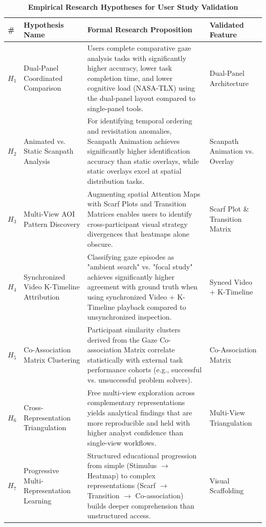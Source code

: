 \documentclass[11pt,a4paper]{article}
\begin{document}
\begin{table}[H]
    \centering
    \caption{\textbf{Empirical Research Hypotheses for User Study Validation}}
    \label{tab:hypotheses}
    \footnotesize
    \begin{tabularx}{\linewidth}{l p{3.2cm} X l}
        \toprule
        \textbf{\#} & \textbf{Hypothesis Name} & \textbf{Formal Research Proposition} & \textbf{Validated Feature} \\
        \midrule
        \textbf{$H_1$} & Dual-Panel Coordinated Comparison & Users complete comparative gaze analysis tasks with significantly higher accuracy, lower task completion time, and lower cognitive load (NASA-TLX) using the dual-panel layout compared to single-panel tools. & Dual-Panel Architecture \\
        \textbf{$H_2$} & Animated vs. Static Scanpath Analysis & For identifying temporal ordering and revisitation anomalies, Scanpath Animation achieves significantly higher identification accuracy than static overlays, while static overlays excel at spatial distribution tasks. & Scanpath Animation vs. Overlay \\
        \textbf{$H_3$} & Multi-View AOI Pattern Discovery & Augmenting spatial Attention Maps with Scarf Plots and Transition Matrices enables users to identify cross-participant visual strategy divergences that heatmaps alone obscure. & Scarf Plot \& Transition Matrix \\
        \textbf{$H_4$} & Synchronized Video K-Timeline Attribution & Classifying gaze episodes as "ambient search" vs. "focal study" achieves significantly higher agreement with ground truth when using synchronized Video + K-Timeline playback compared to unsynchronized inspection. & Synced Video + K-Timeline \\
        \textbf{$H_5$} & Co-Association Matrix Clustering & Participant similarity clusters derived from the Gaze Co-association Matrix correlate statistically with external task performance cohorts (e.g., successful vs. unsuccessful problem solvers). & Co-Association Matrix \\
        \textbf{$H_6$} & Cross-Representation Triangulation & Free multi-view exploration across complementary representations yields analytical findings that are more reproducible and held with higher analyst confidence than single-view workflows. & Multi-View Triangulation \\
        \textbf{$H_7$} & Progressive Multi-Representation Learning & Structured educational progression from simple (Stimulus $\to$ Heatmap) to complex representations (Scarf $\to$ Transition $\to$ Co-association) builds deeper comprehension than unstructured access. & Visual Scaffolding \\

\end{tabularx}
\end{table}
\end{document}
